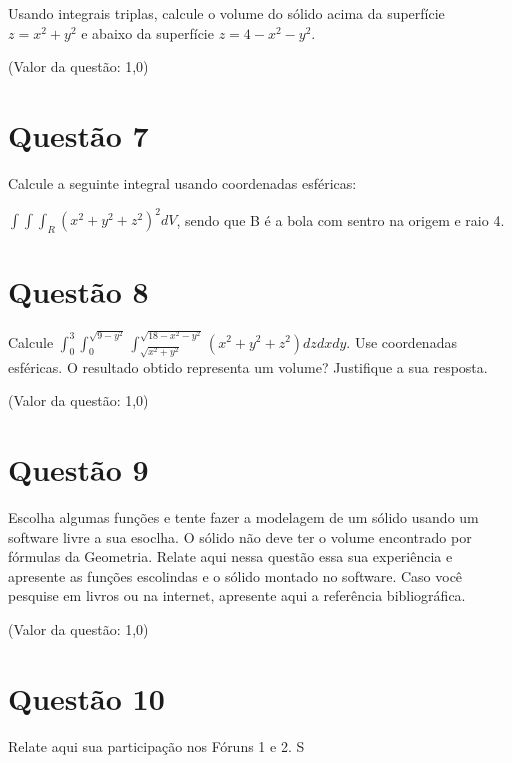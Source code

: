 \documentclass[10pt,a4paper]{article}
\begin{document}
	Usando integrais triplas, calcule o volume do sólido acima da superfície $ z = x^2 + y^2 $ e abaixo da superfície $ z = 4 - x^2 - y^2 $.
	
	(Valor da questão: 1,0)
	
	\section*{Questão 7}
	
	Calcule a seguinte integral usando coordenadas esféricas:
	
	$ \int \int \int_R (x^2 + y^2 + z^2)^2 dV $, sendo que B é a bola com sentro na origem e raio 4.
	
	\section*{Questão 8}
	
	Calcule $ \int_{0}^3 \int_{0}^{\sqrt{9-y^2}} \int_{\sqrt{x^2+y^2}}^{\sqrt{18-x^2-y^2}} (x^2 + y^2 + z^2) dz dx dy $. Use coordenadas esféricas. O resultado obtido representa um volume? Justifique a sua resposta.
	
	(Valor da questão: 1,0)
	
	
	\section*{Questão 9}
	
	Escolha algumas funções e tente fazer a modelagem de um sólido usando um software livre a sua esoclha. O sólido não deve ter o volume encontrado por fórmulas da Geometria. Relate aqui nessa questão essa sua experiência e apresente as funções escolindas e o sólido montado no software. Caso você pesquise em livros ou na internet, apresente aqui a referência bibliográfica.
	
	(Valor da questão: 1,0)
	
	\section*{Questão 10}
	
	Relate aqui sua participação nos Fóruns 1 e 2.
	S
\end{document}
